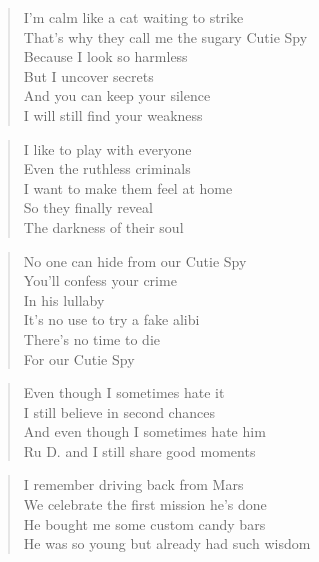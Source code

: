 \begin{verse}
I'm calm like a cat waiting to strike\\
That's why they call me the sugary Cutie Spy\\
Because I look so harmless\\
But I uncover secrets\\
And you can keep your silence \\
I will still find your weakness
\end{verse}

\begin{verse}
I like to play with everyone\\
Even the ruthless criminals\\
I want to make them feel at home\\
So they finally reveal \\
The darkness of their soul
\end{verse}

\begin{verse}
No one can hide from our Cutie Spy\\
You'll confess your crime \\
In his lullaby\\
It's no use to try a fake alibi\\
There's no time to die\\
For our Cutie Spy
\end{verse}

\begin{verse}
Even though I sometimes hate it\\
I still believe in second chances\\
And even though I sometimes hate him\\
Ru D. and I still share good moments
\end{verse}

\begin{verse}
I remember driving back from Mars\\
We celebrate the first mission he's done\\
He bought me some custom candy bars\\
He was so young but already had such wisdom
\end{verse}

\clearpage

